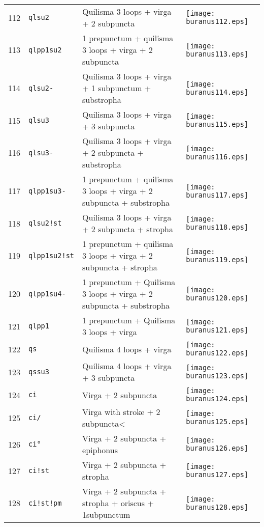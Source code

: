 \documentclass{scrarticle}
\begin{document}
\begin{longtable}{l|l|l|l}
112 & \texttt{qlsu2} & Quilisma 3 loops + virga + 2 subpuncta & \texttt{[image: buranus112.eps]} \\
113 & \texttt{qlpp1su2} & 1 prepunctum + quilisma 3 loops + virga + 2 subpuncta & \texttt{[image: buranus113.eps]} \\
114 & \texttt{qlsu2-} & Quilisma 3 loops + virga + 1 subpunctum + substropha & \texttt{[image: buranus114.eps]} \\
115 & \texttt{qlsu3} & Quilisma 3 loops + virga + 3 subpuncta & \texttt{[image: buranus115.eps]} \\
116 & \texttt{qlsu3-} & Quilisma 3 loops + virga + 2 subpuncta + substropha & \texttt{[image: buranus116.eps]} \\
117 & \texttt{qlpp1su3-} & 1 prepunctum + quilisma 3 loops + virga + 2 subpuncta + substropha & \texttt{[image: buranus117.eps]} \\
118 & \texttt{qlsu2!st} & Quilisma 3 loops + virga + 2 subpuncta + stropha & \texttt{[image: buranus118.eps]} \\
119 & \texttt{qlpp1su2!st} & 1 prepunctum + quilisma 3 loops + virga + 2 subpuncta + stropha & \texttt{[image: buranus119.eps]} \\
120 & \texttt{qlpp1su4-} & 1 prepunctum + Quilisma 3 loops + virga + 2 subpuncta + substropha & \texttt{[image: buranus120.eps]} \\
121 & \texttt{qlpp1} & 1 prepunctum + Quilisma 3 loops + virga & \texttt{[image: buranus121.eps]} \\
122 & \texttt{qs} & Quilisma 4 loops + virga & \texttt{[image: buranus122.eps]} \\
123 & \texttt{qssu3} & Quilisma 4 loops + virga + 3 subpuncta & \texttt{[image: buranus123.eps]} \\
124 & \texttt{ci} & Virga + 2 subpuncta & \texttt{[image: buranus124.eps]} \\
125 & \texttt{ci/} & Virga with stroke + 2 subpuncta< & \texttt{[image: buranus125.eps]} \\
126 & \texttt{ci°} & Virga + 2 subpuncta + epiphonus & \texttt{[image: buranus126.eps]} \\
127 & \texttt{ci!st} & Virga + 2 subpuncta + stropha & \texttt{[image: buranus127.eps]} \\
128 & \texttt{ci!st!pm} & Virga + 2 subpuncta + stropha + oriscus + 1subpunctum & \texttt{[image: buranus128.eps]} \\

\end{longtable}
\end{document}
